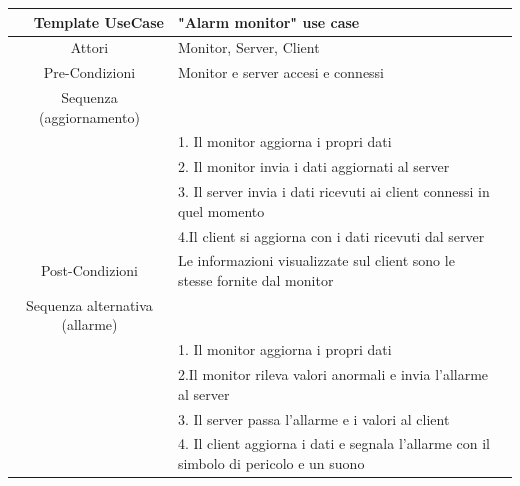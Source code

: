 \documentclass{article}
\begin{document}
\begin{center}

	\begin{tabular}{r@{\vspace{0.4cm}}ll}
	

	\hline
	
	\textbf{Template UseCase  } &  \textbf{       "Alarm monitor" use case } \\

	\hline
	
	\multicolumn{1}{c}{Attori}  & Monitor, Server, Client \\

	\cline{1-1}
\hline

	\multicolumn{1}{c}{Pre-Condizioni}  & Monitor e server accesi e connessi\\ 


\hline
	\multicolumn{1}{c}{Sequenza (aggiornamento) }    \\ \cline{1-1}&
    1.  Il monitor aggiorna i propri dati \\&
    2. Il monitor invia i dati aggiornati al server \\&
    3. Il server invia i dati ricevuti ai client connessi in quel momento\\&
    4.Il client si aggiorna con i dati ricevuti dal server  \\
    

\hline
	
\multicolumn{1}{c}{Post-Condizioni}  &Le informazioni visualizzate sul client sono le stesse fornite dal monitor \\ \cline{1-1}
\hline

\multicolumn{1}{c}{Sequenza alternativa (allarme)}     \\ \cline{1-1}&

 1.  Il monitor aggiorna i propri dati \\&
    2.Il monitor rileva valori anormali e invia l’allarme al server \\&
    3. Il server passa l’allarme e i valori al client\\&
    4. Il client aggiorna i dati e segnala l’allarme con il simbolo di pericolo e un suono  \\

\hline

	\end{tabular}

\end{center}
\end{document}
